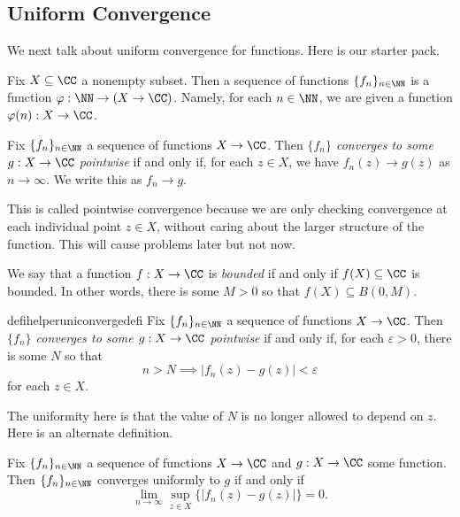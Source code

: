\subsection{Uniform Convergence}
We next talk about uniform convergence for functions. Here is our starter pack.
\begin{definition}
	Fix $X\subseteq\CC$ a nonempty subset. Then a sequence of functions $\{f_n\}_{n\in\NN}$ is a function $\varphi:\NN\to(X\to\CC)$. Namely, for each $n\in\NN$, we are given a function $\varphi(n):X\to\CC$.
\end{definition}
\begin{definition}
	Fix $\{f_n\}_{n\in\NN}$ a sequence of functions $X\to\CC$. Then \textit{$\{f_n\}$ converges to some $g:X\to\CC$ pointwise} if and only if, for each $z\in X$, we have $f_n(z)\to g(z)$ as $n\to\infty$. We write this as $f_n\to g$.
\end{definition}
This is called pointwise convergence because we are only checking convergence at each individual point $z\in X$, without caring about the larger structure of the function. This will cause problems later but not now.
\begin{definition}[Bounded]
	We say that a function $f:X\to\CC$ is \textit{bounded} if and only if $f(X)\subseteq\CC$ is bounded. In other words, there is some $M>0$ so that $f(X)\subseteq B(0,M)$.
\end{definition}
\begin{restatable}{defihelper}{uniconvergedefi} 
	Fix $\{f_n\}_{n\in\NN}$ a sequence of functions $X\to\CC$. Then \textit{$\{f_n\}$ converges to some $g:X\to\CC$ pointwise} if and only if, for each $\varepsilon>0$, there is some $N$ so that
	\[n>N\implies|f_n(z)-g(z)|<\varepsilon\]
	for each $z\in X$.
\end{restatable}
The uniformity here is that the value of $N$ is no longer allowed to depend on $z$. Here is an alternate definition.
\begin{proposition} \label{prop:definefuncdist}
	Fix $\{f_n\}_{n\in\NN}$ a sequence of functions $X\to\CC$ and $g:X\to\CC$ some function. Then $\{f_n\}_{n\in\NN}$ converges uniformly to $g$ if and only if
	\[\lim_{n\to\infty}\sup_{z\in X}\{|f_n(z)-g(z)|\}=0.\]
\end{proposition}
